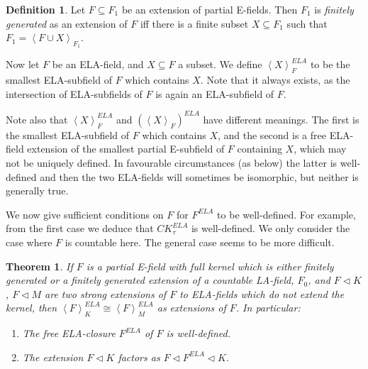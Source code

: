 \documentclass[12pt]{amsart}
\newtheorem{theorem}[prop]{Theorem}
\theoremstyle{definition}
\newtheorem{defn}[prop]{Definition}
\begin{document}
\begin{defn}
 Let $F {\subseteq} F_1$ be an extension of partial E-fields. Then $F_1$ is \emph{finitely generated} as an extension of $F$ iff there is a finite subset $X {\subseteq} F_1$ such that $F_1 = {\ensuremath{\left\langle {F \cup X} \right\rangle}}_{F_1}$.

Now let $F$ be an ELA-field, and $X {\subseteq} F$ a subset. We define ${\ensuremath{\left\langle {X} \right\rangle}}_F^{ELA}$ to be the smallest ELA-subfield of $F$ which contains $X$. Note that it always exists, as the intersection of ELA-subfields of $F$ is again an ELA-subfield of $F$.
\end{defn}
Note also that ${\ensuremath{\left\langle {X} \right\rangle}}_F^{ELA}$ and $({\ensuremath{\left\langle {X} \right\rangle}}_F)^{ELA}$ have different meanings. The first is the smallest ELA-subfield of $F$ which contains $X$, and the second is a free ELA-field extension of the smallest partial E-subfield of $F$ containing $X$, which may not be uniquely defined. In favourable circumstances (as below) the latter is well-defined and then the two ELA-fields will sometimes be isomorphic, but neither is generally true.

We now give sufficient conditions on $F$ for $F^{ELA}$ to be
well-defined. For example, from the first case we deduce that
$CK_\tau^{ELA}$ is well-defined. We only consider the case where $F$
is countable here. The general case seems to be more difficult.

\begin{theorem}\label{ELA-well-defined}
  If $F$ is a partial E-field with full kernel which is either finitely generated or a finitely generated extension of a countable LA-field, $F_0$, and $F {\ensuremath{\lhd}} K$, $F {\ensuremath{\lhd}} M$ are two strong extensions of $F$ to ELA-fields which do not extend the kernel, then ${\ensuremath{\left\langle {F} \right\rangle}}_K^{ELA} {\cong} {\ensuremath{\left\langle {F} \right\rangle}}_M^{ELA}$ as extensions of $F$. In particular:
  \begin{enumerate}
  \item The free ELA-closure $F^{ELA}$ of $F$ is well-defined.
\item The extension $F {\ensuremath{\lhd}} K$ factors as $F {\ensuremath{\lhd}} F^{ELA} {\ensuremath{\lhd}} K$.
\end{enumerate}
\end{theorem}
\end{document}
